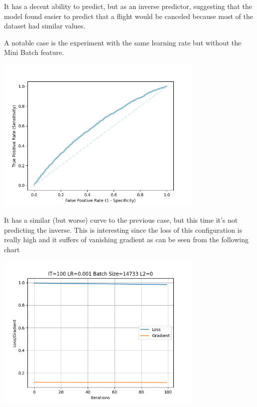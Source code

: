 \documentclass[
	letterpaper, %
	10pt, %
]{class}
\begin{document}
It has a decent ability to predict, but as an inverse predictor, suggesting that the model found easier to predict that a flight would be canceled because most of the dataset had similar values.

A notable case is the experiment with the same learning rate but without the Mini Batch feature.

\begin{center}
    \includegraphics[width=10cm]{../images/roc_2.png}
\end{center}

It has a similar (but worse) curve to the previous case, but this time it's not predicting the inverse. This is interesting since the loss of this configuration is really high and it suffers of vanishing gradient as can be seen from the following chart

\begin{center}
    \includegraphics[width=10cm]{../images/graph_3.png}
\end{center}
\end{document}
